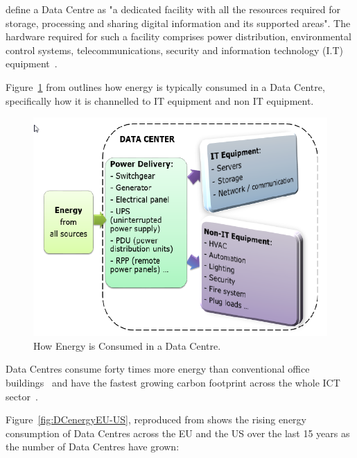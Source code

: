 \documentclass[12pt]{scrartcl}
\begin{document}
\citet{edsdoj.99f37e7899fb4fcaabdaa81e395626c420180101} define a Data Centre as "a dedicated facility with all the resources required for storage, processing and sharing digital information and its supported areas".  The hardware required for such a facility comprises power distribution, environmental control systems, telecommunications, security and information technology (I.T) equipment~\citep{edsdoj.99f37e7899fb4fcaabdaa81e395626c420180101}. 

Figure~\ref{fig:DCenergy} from \citep{edsdoj.99f37e7899fb4fcaabdaa81e395626c420180101} outlines how energy is typically consumed in a Data Centre, specifically how it is channelled to IT equipment and non IT equipment.

\begin{figure}[h]
  \caption{How Energy is Consumed in a Data Centre.}
  \label{fig:DCenergy}
  \centering
    \includegraphics[scale=0.35]{Data_center_energy.png}
\end{figure}


Data Centres consume forty times more energy than conventional office buildings~\citep{edsdoj.99f37e7899fb4fcaabdaa81e395626c420180101} and have the fastest growing carbon footprint across the whole ICT sector~\citep{edsbas.13818AC20170101}.

Figure~\ref{fig:DCenergyEU-US}, reproduced from \citet{edsbas.13818AC20170101} shows the rising energy consumption of Data Centres across the EU and the US over the last 15 years as the number of Data Centres have grown:
\end{document}
